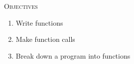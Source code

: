 \textsc{Objectives}
 \begin{enumerate}
   \item Write functions
   \item Make function calls
   \item Break down a program into functions
 \end{enumerate}
\mbox{}

